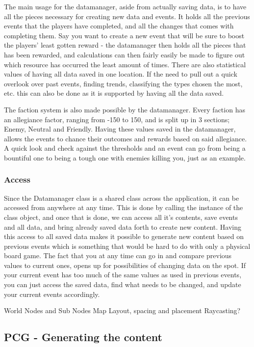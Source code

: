 The main usage for the datamanager, aside from actually saving data, is to have all the pieces necessary for creating new data and events. It holds all the previous events that the players have completed, and all the changes that comes with completing them. Say you want to create a new event that will be sure to boost the players' least gotten reward - the datamanager then holds all the pieces that has been rewarded, and calculations can then fairly easily be made to figure out which resource has occurred the least amount of times.
There are also statistical values of having all data saved in one location. If the need to pull out a quick overlook over past events, finding trends, classifying the types chosen the most, etc. this can also be done as it is supported by having all the data saved.

The faction system is also made possible by the datamanager. Every faction has an allegiance factor, ranging from -150 to 150, and is split up in 3 sections; Enemy, Neutral and Friendly. Having these values saved in the datamanager, allows the events to chance their outcomes and rewards based on said allegiance. A quick look and check against the thresholds and an event can go from being a bountiful one to being a tough one with enemies killing you, just as an example.


\subsubsection{Access}
	
Since the Datamanager class is a shared class across the application, it can be accessed from anywhere at any time. This is done by calling the instance of the class object, and once that is done, we can access all it's contents, save events and all data, and bring already saved data forth to create new content. Having this access to all saved data makes it possible to generate new content based on previous events which is something that would be hard to do with only a physical board game. 
The fact that you at any time can go in and compare previous values to current ones, opens up for possibilities of changing data on the spot. If your current event has too much of the same values as used in previous events, you can just access the saved data, find what needs to be changed, and update your current events accordingly.	


World Nodes and Sub Nodes
Map Layout, spacing and placement
Raycasting?
\subsection{PCG - Generating the content}
